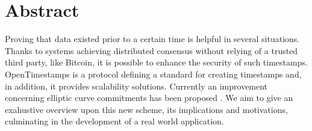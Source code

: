 \chapter{Abstract}
\label{chpr:abstract}

Proving that data existed prior to a certain time is helpful in several situations.
Thanks to systems achieving distributed consensus without relying of a trusted third party, like Bitcoin, it is possible to enhance the security of such timestamps.
OpenTimestamps is a protocol defining a standard for creating timestamps and, in addition, it provides scalability solutions.
Currently an improvement concerning elliptic curve commitments has been proposed \cite{PoePR}. 
We aim to give an exahustive overview upon this new scheme, its implications and motivations, culminating in the development of a real world application.

